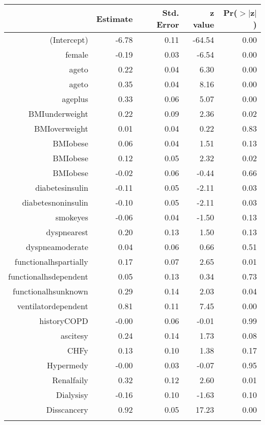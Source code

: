 \bigskip\bigskip
\centering
\begin{tabular}{rrrrr}
  \hline
 & Estimate & Std. Error & z value & Pr($>$$|$z$|$) \\ 
  \hline
(Intercept) & -6.78 & 0.11 & -64.54 & 0.00 \\ 
  female & -0.19 & 0.03 & -6.54 & 0.00 \\ 
  age\-65\-to\-74 & 0.22 & 0.04 & 6.30 & 0.00 \\ 
  age\-75\-to\-84 & 0.35 & 0.04 & 8.16 & 0.00 \\ 
  age\-85\-plus & 0.33 & 0.06 & 5.07 & 0.00 \\ 
  BMI\-underweight & 0.22 & 0.09 & 2.36 & 0.02 \\ 
  BMI\-overweight & 0.01 & 0.04 & 0.22 & 0.83 \\ 
  BMI\-obese\-1 & 0.06 & 0.04 & 1.51 & 0.13 \\ 
  BMI\-obese\-2 & 0.12 & 0.05 & 2.32 & 0.02 \\ 
  BMI\-obese\-3 & -0.02 & 0.06 & -0.44 & 0.66 \\ 
  diabetes\-insulin & -0.11 & 0.05 & -2.11 & 0.03 \\ 
  diabetes\-noninsulin & -0.10 & 0.05 & -2.11 & 0.03 \\ 
  smoke\-yes & -0.06 & 0.04 & -1.50 & 0.13 \\ 
  dyspnea\-rest & 0.20 & 0.13 & 1.50 & 0.13 \\ 
  dyspnea\-moderate & 0.04 & 0.06 & 0.66 & 0.51 \\ 
  functional\-hs\-partially & 0.17 & 0.07 & 2.65 & 0.01 \\ 
  functional\-hs\-dependent & 0.05 & 0.13 & 0.34 & 0.73 \\ 
  functional\-hs\-unknown & 0.29 & 0.14 & 2.03 & 0.04 \\ 
  ventilator\-dependent & 0.81 & 0.11 & 7.45 & 0.00 \\ 
  history\-COPD & -0.00 & 0.06 & -0.01 & 0.99 \\ 
  ascites\-y & 0.24 & 0.14 & 1.73 & 0.08 \\ 
  CHF\-y & 0.13 & 0.10 & 1.38 & 0.17 \\ 
  Hyper\-med\-y & -0.00 & 0.03 & -0.07 & 0.95 \\ 
  Renal\-fail\-y & 0.32 & 0.12 & 2.60 & 0.01 \\ 
  Dialysis\-y & -0.16 & 0.10 & -1.63 & 0.10 \\ 
  Diss\-cancer\-y & 0.92 & 0.05 & 17.23 & 0.00 \\ 
$$
\end{tabular}

